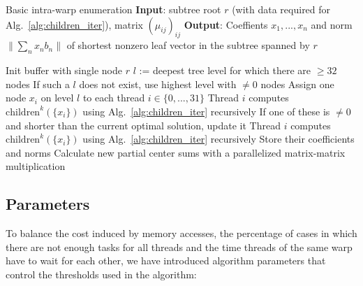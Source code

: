 \documentclass{scrartcl}
\begin{document}
    \begin{algorithm}[H]
        \caption{
            Basic intra-warp enumeration\label{alg:warp_enum}
            \newline
            \textbf{Input}: subtree root $r$ (with data required for Alg.\ \ref{alg:children_iter}), matrix $(\mu_{ij})_{ij}$
            \newline
            \textbf{Output}: Coeffients $x_1, ..., x_n$ and norm $\| \sum_n x_n b_n \|$ of shortest nonzero leaf vector in the subtree spanned by $r$
        }
        \begin{algorithmic}
            \STATE Init buffer with single node $r$
                \STATE $l$ := deepest tree level for which there are $\geq 32$ nodes
                \STATE If such a $l$ does not exist, use highest level with $\neq 0$ nodes
                \STATE Assign one node $x_i$ on level $l$ to each thread $i \in \{0, ..., 31\}$
                    \STATE Thread $i$ computes $\mathrm{children}^k(\{x_i\})$ using Alg.\ \ref{alg:children_iter} recursively
                    \STATE If one of these is $\neq 0$ and shorter than the current optimal solution, update it
                \ELSE
                    \STATE Thread $i$ computes $\mathrm{children}^k(\{x_i\})$ using Alg.\ \ref{alg:children_iter} recursively
                    \STATE Store their coefficients and norms
                    \STATE Calculate new partial center sums with a parallelized matrix-matrix multiplication
                \ENDIF
                \ENDWHILE
        \end{algorithmic}
    \end{algorithm}

    \subsection{Parameters}

    To balance the cost induced by memory accesses, the percentage of cases in which there are not enough tasks for all threads and the time threads of the same warp have to wait for each other, we have introduced algorithm parameters that control the thresholds used in the algorithm:
    
\end{document}
